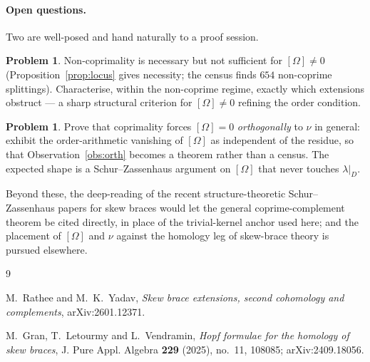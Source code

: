 \documentclass[11pt]{article}
\theoremstyle{definition}
\newtheorem{problem}[theorem]{Problem}
\begin{document}
\paragraph{Open questions.}
Two are well-posed and hand naturally to a proof session.
\begin{problem}
Non-coprimality is necessary but not sufficient for $[\Omega]\ne0$ (Proposition~\ref{prop:locus}
gives necessity; the census finds $654$ non-coprime splittings). Characterise, within the
non-coprime regime, exactly which extensions obstruct --- a sharp structural criterion for
$[\Omega]\ne0$ refining the order condition.
\end{problem}
\begin{problem}
Prove that coprimality forces $[\Omega]=0$ \emph{orthogonally} to $\nu$ in general: exhibit
the order-arithmetic vanishing of $[\Omega]$ as independent of the residue, so that
Observation~\ref{obs:orth} becomes a theorem rather than a census. The expected shape is a
Schur--Zassenhaus argument on $[\Omega]$ that never touches $\lambda|_D$.
\end{problem}

Beyond these, the deep-reading of the recent structure-theoretic Schur--Zassenhaus papers for
skew braces would let the general coprime-complement theorem be cited directly, in place of
the trivial-kernel anchor used here; and the placement of $[\Omega]$ and $\nu$ against the
homology leg of skew-brace theory \cite{GLV} is pursued elsewhere.

\begin{thebibliography}{9}

M.~Rathee and M.~K.~Yadav,
\emph{Skew brace extensions, second cohomology and complements},
arXiv:2601.12371.

M.~Gran, T.~Letourmy and L.~Vendramin,
\emph{Hopf formulae for the homology of skew braces},
J. Pure Appl. Algebra \textbf{229} (2025), no.~11, 108085; arXiv:2409.18056.

\end{thebibliography}
\end{document}
